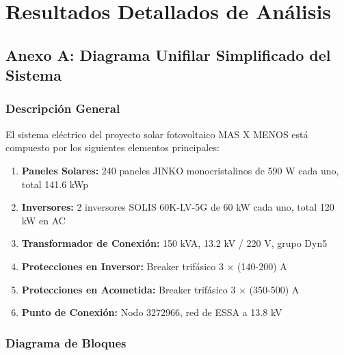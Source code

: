 \chapter{Resultados Detallados de Análisis}

\section{Anexo A: Diagrama Unifilar Simplificado del Sistema}

\subsection{Descripción General}

El sistema eléctrico del proyecto solar fotovoltaico MAS X MENOS está compuesto por los siguientes elementos principales:

\begin{enumerate}
    \item \textbf{Paneles Solares:} 240 paneles JINKO monocristalinos de 590 W cada uno, total 141.6 kWp
    
    \item \textbf{Inversores:} 2 inversores SOLIS 60K-LV-5G de 60 kW cada uno, total 120 kW en AC
    
    \item \textbf{Transformador de Conexión:} 150 kVA, 13.2 kV / 220 V, grupo Dyn5
    
    \item \textbf{Protecciones en Inversor:} Breaker trifásico 3 × (140-200) A
    
    \item \textbf{Protecciones en Acometida:} Breaker trifásico 3 × (350-500) A
    
    \item \textbf{Punto de Conexión:} Nodo 3272966, red de ESSA a 13.8 kV
\end{enumerate}

\subsection{Diagrama de Bloques}

